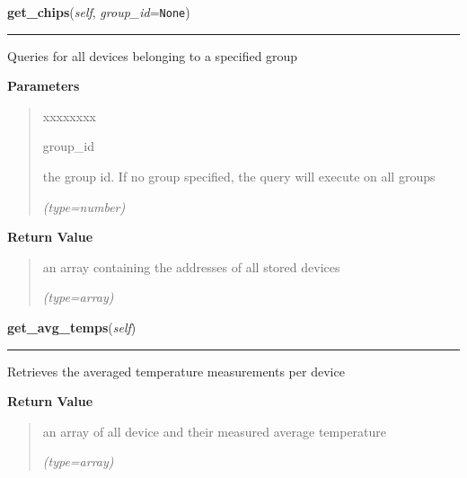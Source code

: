 \hspace{.8\funcindent}\begin{boxedminipage}{\funcwidth}

    \raggedright \textbf{get\_chips}(\textit{self}, \textit{group\_id}={\tt None})

    \vspace{-1.5ex}

    \rule{\textwidth}{0.5\fboxrule}
\setlength{\parskip}{2ex}
    Queries for all devices belonging to a specified group

\setlength{\parskip}{1ex}
      \textbf{Parameters}
      \vspace{-1ex}

      \begin{quote}
        \begin{Ventry}{xxxxxxxx}

          \item[group\_id]

          the group id. If no group specified, the query will execute on 
          all groups

            {\it (type=number)}

        \end{Ventry}

      \end{quote}

      \textbf{Return Value}
    \vspace{-1ex}

      \begin{quote}
      an array containing the addresses of all stored devices

      {\it (type=array)}

      \end{quote}

    \end{boxedminipage}

    \label{DBE:DBE:get_avg_temps}

    \vspace{0.5ex}

\hspace{.8\funcindent}\begin{boxedminipage}{\funcwidth}

    \raggedright \textbf{get\_avg\_temps}(\textit{self})

    \vspace{-1.5ex}

    \rule{\textwidth}{0.5\fboxrule}
\setlength{\parskip}{2ex}
    Retrieves the averaged temperature measurements per device

\setlength{\parskip}{1ex}
      \textbf{Return Value}
    \vspace{-1ex}

      \begin{quote}
      an array of all device and their measured average temperature

      {\it (type=array)}

      \end{quote}

    \end{boxedminipage}

